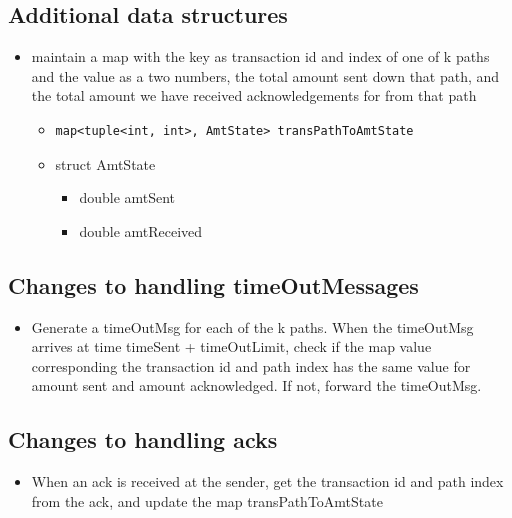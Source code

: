 \documentclass[a4paper]{article}
\begin{document}
\subsection{Additional data structures}
\begin{itemize}
    \item maintain a map with the key as transaction id and index of one of k paths and the value as a two numbers, the total amount sent down that path, and the total amount we have received acknowledgements for from that path
    \begin{itemize}
        \item \begin{verbatim}map<tuple<int, int>, AmtState> transPathToAmtState \end{verbatim}
        \item struct AmtState
            \begin{itemize}
                \item double amtSent
                \item double amtReceived
            \end{itemize}
    \end{itemize}
\end{itemize}
\subsection{Changes to handling timeOutMessages}
\begin{itemize}
    \item Generate a timeOutMsg for each of the k paths. When the timeOutMsg arrives at time timeSent + timeOutLimit, check if the map value corresponding the transaction id and path index has the same value for amount sent and amount acknowledged. If not, forward the timeOutMsg.
\end{itemize}
\subsection{Changes to handling acks}
\begin{itemize}
    \item When an ack is received at the sender, get the transaction id and path index from the ack, and update the map transPathToAmtState
\end{itemize}
\end{document}
